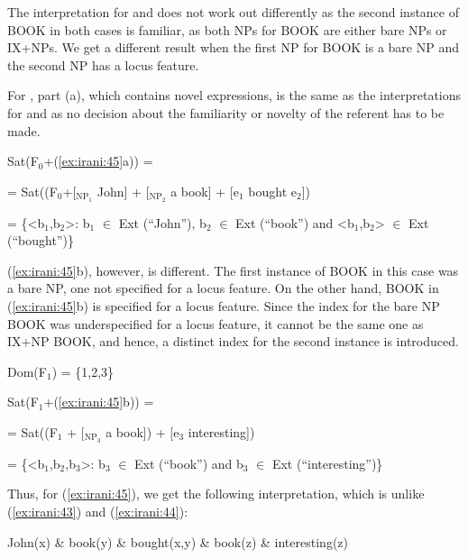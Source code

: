 \documentclass[output=paper,
modfonts
]{langscibook}
\begin{document}
The interpretation for  and  does not work out differently as the second instance of BOOK in both cases is familiar, as both NPs for BOOK are either bare NPs or IX+NPs. We get a different result when the first NP for BOOK is a bare NP and the second NP has a locus feature. 

For , part (a), which contains novel expressions, is the same as the interpretations for  and  as no decision about the familiarity or novelty of the referent has to be made. 

\begin{exe}

\ex Sat(F$_0$+(\ref{ex:irani:45}a)) = \par 
= Sat((F$_0$+[$_{\text{NP}_{1}}$ John] + [$_{\text{NP}_{2}}$ a book] + [e$_1$ bought e$_2$])\par 
= \{<b$_1$,b$_2$>: b$_1$ \(\in\) Ext (``John''), b$_2$ \(\in\) Ext (``book'') and <b$_1$,b$_2$> \(\in\) Ext (``bought'')\} \par 

\end{exe} 

(\ref{ex:irani:45}b), however, is different. The first instance of BOOK in this case was a bare NP, one not specified for a locus feature. On the other hand, BOOK in (\ref{ex:irani:45}b) is specified for a locus feature. Since the index for the bare NP BOOK was underspecified for a locus feature, it cannot be the same one as IX+NP BOOK, and hence, a distinct index for the second instance is introduced. 

\begin{exe}

\ex Dom(F$_1$) = \{1,2,3\}\par 

Sat(F$_1$+(\ref{ex:irani:45}b)) = \par 
= Sat((F$_1$ + [$_{\text{NP}_{3}}$ a book]) + [e$_3$ interesting]) \par 
= \{<b$_1$,b$_2$,b$_3$>: b$_3$ \(\in\) Ext (``book'') and b$_3$ \(\in\) Ext (``interesting'')\} \par 

\end{exe}

Thus, for (\ref{ex:irani:45}), we get the following interpretation, which is unlike (\ref{ex:irani:43}) and (\ref{ex:irani:44}): 

\begin{exe}

\ex John(x) \& book(y) \& bought(x,y) \& book(z) \& interesting(z) \par 

\end{exe}
\end{document}
